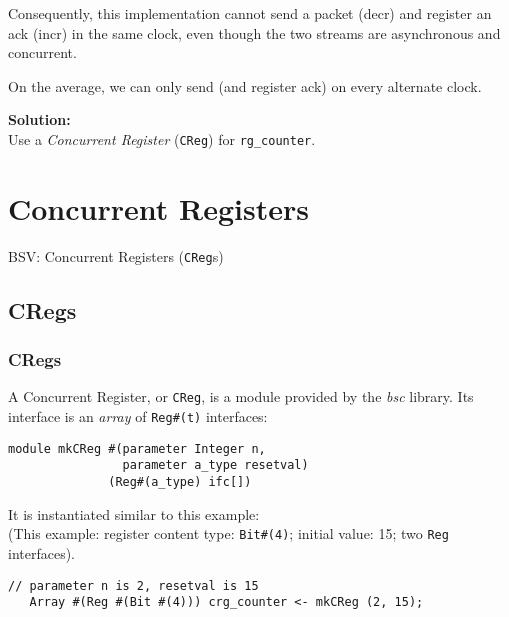 \begin{frame}[fragile]
\begin{minipage}{0.4\textwidth}
{\scriptsize
Consequently, this implementation cannot send a packet (decr) and
register an ack (incr) in the same clock, even though the two streams
are asynchronous and concurrent.}

\vspace{1ex}

{\scriptsize
On the average, we can only send (and register ack) on every alternate clock.}

\vspace{2ex}

{\bf Solution:} \\
Use a \emph{Concurrent Register} ({\tt CReg}) for {\tt rg\_counter}.

\end{minipage}

\end{frame}


\section{Concurrent Registers}

\begin{frame}

\begin{center}
  {\LARGE BSV: Concurrent Registers ({\tt CReg}s)}
\end{center}

\end{frame}


\subsection{CRegs}

\begin{frame}[fragile]
\frametitle{CRegs}

\footnotesize

A Concurrent Register, or \verb|CReg|, is a module provided by
 the \emph{bsc} library.  Its interface is an \emph{array}
 of \verb|Reg#(t)| interfaces:

\begin{Verbatim}[frame=single]
module mkCReg #(parameter Integer n,
                parameter a_type resetval)
              (Reg#(a_type) ifc[])
\end{Verbatim}

\vspace{5ex}

It is instantiated similar to this example: \\
(This example: register content type: \verb|Bit#(4)|; initial value: 15; two {\tt Reg} interfaces).

\begin{Verbatim}[frame=single]
   // parameter n is 2, resetval is 15
   Array #(Reg #(Bit #(4))) crg_counter <- mkCReg (2, 15);
\end{Verbatim}

\end{frame}

